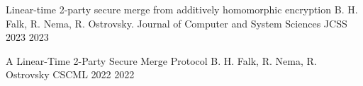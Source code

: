 

\begin{cvhonors}
  \cvhonor
    {Linear-time 2-party secure merge from additively homomorphic encryption}
    {B. H. Falk, R. Nema, R. Ostrovsky. Journal of Computer and System Sciences}
    {JCSS 2023} 
    {2023}
    
  \cvhonor
    {A Linear-Time 2-Party Secure Merge Protocol}
    {B. H. Falk, R. Nema, R. Ostrovsky}
    {CSCML 2022} 
    {2022}
    
\end{cvhonors}